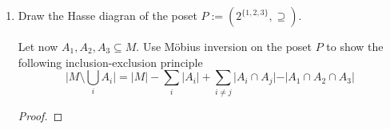 \documentclass[12pt]{article}
\begin{document}
\begin{enumerate}
\begin{proof}
        Now notice that $\delta( (a,b) , (c,d)) = \displaystyle\sum\limits_{(x,y) \in [(a,b),(c,d)]} \mu_{P} ((x,y),(c,d))$
        
        On the other hand, $\delta( (a,b) , (c,d)) = \delta( a, c) \cdot \delta(b,d) = \displaystyle\sum \limits_{x \in [a,c]} \mu_{P_1}(x,c) \displaystyle\sum \limits_{y \in [b,d]} \mu_{P_2}(y,d) = \displaystyle \sum \limits_{(x,y) \in [(a,b),(c,d)]} \mu_{P_1}(x,c) \cdot \mu_{P_2}(y,d)$
        
        Applying the first equation yields 
        
        $$\displaystyle \displaystyle\sum\limits_{(x,y) \in [(a,b),(c,d)]} \mu_{P} ((x,y),(c,d)) = \displaystyle \sum \limits_{(x,y) \in [(a,b),(c,d)]} \mu_{P_1}(x,c) \cdot \mu_{P_2}(y,d)$$
        
        Since we are only considering locally finite posets, then it can be shown by induction over $\vert [(a,b),(c,d)] \vert $ that $\mu_P((x,y), (c,d)) = \mu_{P_1}(x,c) \cdot \mu_{P_2}(y,d)$ for any $(x,y) \in [(a,b),(c,d)]$
        
        $$\mu_P((a,x),(b,y)) = \mu_{P_1}(a,b) \cdot \mu_{P_2}(x,y)$$
        \end{proof}
        
        \item Draw the Hasse diagran of the poset $P:= ( 2^{\{1,2,3\}}, \supseteq)$.
        
        Let now $A_1, A_2, A_3 \subseteq M$. Use Möbius inversion on the poset $P$ to show the following inclusion-exclusion principle
        $$ \vert M \setminus \bigcup\limits_i A_i \vert  = \vert M \vert - \displaystyle \sum \limits_i \vert A_i \vert + \displaystyle \sum_{i \neq j}  \vert A_i \cap A_j \vert - \vert A_1\cap A_2 \cap A_3 \vert$$
        
        \begin{proof}
            
        \end{proof}
        \begin{center}
\end{center}
\end{enumerate}
\end{document}
